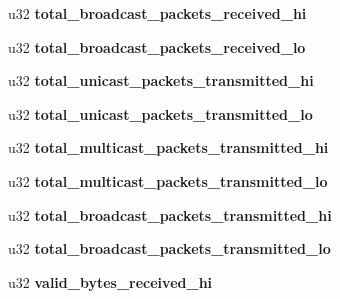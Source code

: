 \begin{DoxyCompactItemize}
\item 
\hypertarget{structbnx2x__eth__stats_a03813c1c8fdd17f070d824c08d43a8c2}{
u32 {\bfseries total\_\-broadcast\_\-packets\_\-received\_\-hi}}
\label{structbnx2x__eth__stats_a03813c1c8fdd17f070d824c08d43a8c2}

\item 
\hypertarget{structbnx2x__eth__stats_a080536b687e3a5da705aeadc3a5faaad}{
u32 {\bfseries total\_\-broadcast\_\-packets\_\-received\_\-lo}}
\label{structbnx2x__eth__stats_a080536b687e3a5da705aeadc3a5faaad}

\item 
\hypertarget{structbnx2x__eth__stats_a9a958e03d7818567af4bceac07302bad}{
u32 {\bfseries total\_\-unicast\_\-packets\_\-transmitted\_\-hi}}
\label{structbnx2x__eth__stats_a9a958e03d7818567af4bceac07302bad}

\item 
\hypertarget{structbnx2x__eth__stats_a9f82ebd992cb3c77a68cf52cb2179630}{
u32 {\bfseries total\_\-unicast\_\-packets\_\-transmitted\_\-lo}}
\label{structbnx2x__eth__stats_a9f82ebd992cb3c77a68cf52cb2179630}

\item 
\hypertarget{structbnx2x__eth__stats_a3335eb9100582c164d4a185100f3cba6}{
u32 {\bfseries total\_\-multicast\_\-packets\_\-transmitted\_\-hi}}
\label{structbnx2x__eth__stats_a3335eb9100582c164d4a185100f3cba6}

\item 
\hypertarget{structbnx2x__eth__stats_a931945ac9163702b3be3768d0cc81c3c}{
u32 {\bfseries total\_\-multicast\_\-packets\_\-transmitted\_\-lo}}
\label{structbnx2x__eth__stats_a931945ac9163702b3be3768d0cc81c3c}

\item 
\hypertarget{structbnx2x__eth__stats_a48c05f61ff6e7eeb169e6fbfa5fdb209}{
u32 {\bfseries total\_\-broadcast\_\-packets\_\-transmitted\_\-hi}}
\label{structbnx2x__eth__stats_a48c05f61ff6e7eeb169e6fbfa5fdb209}

\item 
\hypertarget{structbnx2x__eth__stats_ad99ecae0fd88d68508fe955a8b20da93}{
u32 {\bfseries total\_\-broadcast\_\-packets\_\-transmitted\_\-lo}}
\label{structbnx2x__eth__stats_ad99ecae0fd88d68508fe955a8b20da93}

\item 
\hypertarget{structbnx2x__eth__stats_a453a98d048b1f3abc20f401393084bd8}{
u32 {\bfseries valid\_\-bytes\_\-received\_\-hi}}
\label{structbnx2x__eth__stats_a453a98d048b1f3abc20f401393084bd8}


\end{DoxyCompactItemize}
